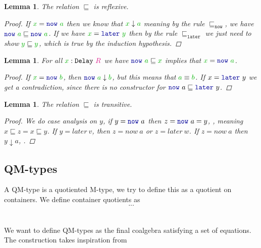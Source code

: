 \documentclass[twoside,11pt,openright]{report}
\theoremstyle{plain} %
\newtheorem{lem}[thm]{Lemma}
\theoremstyle{definition}
\theoremstyle{remark}
\newcommand*{\term}[1]{\textcolor{green!70!black}{#1}} %
\newcommand*{\type}[1]{\textcolor{magenta!90!black}{#1}}
\newcommand*{\function}[1]{\textcolor{blue!60!black}{\ensuremath{\mathtt{#1}}}}
\newcommand*{\typeformer}[1]{\ensuremath{\mathtt{#1}}}
\begin{document}
\begin{lem}
  The relation \(\sqsubseteq\) is reflexive.
  \begin{proof}
    If \(\term{x} = \function{now}~\term{a}\) then we know that \(\term{x} \downarrow \term{a}\) meaning by the rule \(\sqsubseteq_{\mathtt{now}}\), we have \(\function{now}~\term{a} \sqsubseteq \function{now}~\term{a}\). If we have \(\term{x} = \function{later}~\term{y}\) then by the rule \(\sqsubseteq_{\mathtt{later}}\) we just need to show \(\term{y} \sqsubseteq \term{y}\), which is true by the induction hypothesis.
  \end{proof}
\end{lem}

\begin{lem}
  For all \(\term{x} : \typeformer{Delay}~\type{R}\) we have \(\function{now}~\term{a} \sqsubseteq \term{x}\) implies that \(\term{x} = \function{now}~\term{a}\).
  \begin{proof}
    If \(\term{x} = \function{now}~\term{b}\), then \(\function{now}~\term{a} \downarrow \term{b}\), but this means that \(\term{a} \equiv \term{b}\). If  \(x = \function{later}~y\) we get a contradiction, since there is no constructor for \(\function{now}~a \sqsubseteq \function{later}~y\).
  \end{proof}
\end{lem}
\begin{lem}
  The relation \(\sqsubseteq\) is transitive.
  \begin{proof}
    We do case analysis on \(y\), if \(y = \function{now}~a\) then \(z = \function{now}~a = y\), , meaning \(x \sqsubseteq z = x \sqsubseteq y\). If \(y = later~v\), then \(z = now~a\) or \(z = later~w\). If \(z = now~a\) then \(y \downarrow a\), .
  \end{proof}
\end{lem}




\subsection{QM-types}
A QM-type is a quotiented M-type, we try to define this as a quotient on containers. We define container quotients as
\begin{equation}
  ...
\end{equation}
\\ \\
We want to define QM-types as the final coalgebra satisfying a set of equations. The construction takes inspiration from \cite{Infinitary-QIITs}
\end{document}
